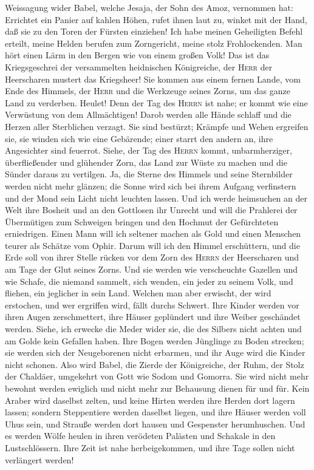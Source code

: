  Weissagung wider Babel, welche Jesaja, der Sohn des Amoz,
vernommen hat:  Errichtet ein Panier auf kahlen Höhen,
rufet ihnen laut zu, winket mit der Hand, daß sie zu den Toren der
Fürsten einziehen!  Ich habe meinen Geheiligten Befehl
erteilt, meine Helden berufen zum Zorngericht, meine stolz
Frohlockenden.  Man hört einen Lärm in den Bergen wie von
einem großen Volk! Das ist das Kriegsgeschrei der versammelten
heidnischen Königreiche, der \textsc{Herr} der Heerscharen mustert das
Kriegsheer!  Sie kommen aus einem fernen Lande, vom Ende
des Himmels, der \textsc{Herr} und die Werkzeuge seines Zorns, um das
ganze Land zu verderben.  Heulet! Denn der Tag des
\textsc{Herrn} ist nahe; er kommt wie eine Verwüstung von dem
Allmächtigen!  Darob werden alle Hände schlaff und die
Herzen aller Sterblichen verzagt.  Sie sind bestürzt;
Krämpfe und Wehen ergreifen sie, sie winden sich wie eine Gebärende;
einer starrt den andern an, ihre Angesichter sind feuerrot.
 Siehe, der Tag des \textsc{Herrn} kommt, unbarmherziger,
überfließender und glühender Zorn, das Land zur Wüste zu machen und die
Sünder daraus zu vertilgen.  Ja, die Sterne des Himmels
und seine Sternbilder werden nicht mehr glänzen; die Sonne wird sich bei
ihrem Aufgang verfinstern und der Mond sein Licht nicht leuchten lassen.
 Und ich werde heimsuchen an der Welt ihre Bosheit und an
den Gottlosen ihr Unrecht und will die Prahlerei der Übermütigen zum
Schweigen bringen und den Hochmut der Gefürchteten erniedrigen.
 Einen Mann will ich seltener machen als Gold und einen
Menschen teurer als Schätze vom Ophir.  Darum will ich
den Himmel erschüttern, und die Erde soll von ihrer Stelle rücken vor
dem Zorn des \textsc{Herrn} der Heerscharen und am Tage der Glut seines
Zorns.  Und sie werden wie verscheuchte Gazellen und wie
Schafe, die niemand sammelt, sich wenden, ein jeder zu seinem Volk, und
fliehen, ein jeglicher in sein Land.  Welchen man aber
erwischt, der wird erstochen, und wer ergriffen wird, fällt durchs
Schwert.  Ihre Kinder werden vor ihren Augen
zerschmettert, ihre Häuser geplündert und ihre Weiber geschändet werden.
 Siehe, ich erwecke die Meder wider sie, die des Silbers
nicht achten und am Golde kein Gefallen haben.  Ihre
Bogen werden Jünglinge zu Boden strecken; sie werden sich der
Neugeborenen nicht erbarmen, und ihr Auge wird die Kinder nicht schonen.
 Also wird Babel, die Zierde der Königreiche, der Ruhm,
der Stolz der Chaldäer, umgekehrt von Gott wie Sodom und Gomorra.
 Sie wird nicht mehr bewohnt werden ewiglich und nicht
mehr zur Behausung dienen für und für. Kein Araber wird daselbst zelten,
und keine Hirten werden ihre Herden dort lagern lassen; 
sondern Steppentiere werden daselbst liegen, und ihre Häuser werden voll
Uhus sein, und Strauße werden dort hausen und Gespenster herumhuschen.
 Und es werden Wölfe heulen in ihren verödeten Palästen
und Schakale in den Lustschlössern. Ihre Zeit ist nahe herbeigekommen,
und ihre Tage sollen nicht verlängert werden!

